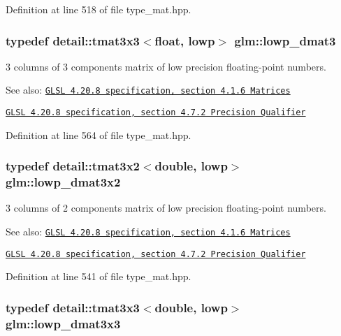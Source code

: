 Definition at line 518 of file type\_\-mat.hpp.\hypertarget{group__core__precision_g07d9423bdde2d7ff880d6ece01dc9e32}{
\subsubsection[lowp\_\-dmat3]{\setlength{\rightskip}{0pt plus 5cm}typedef detail::tmat3x3$<$float, lowp$>$ {\bf glm::lowp\_\-dmat3}}}
\label{group__core__precision_g07d9423bdde2d7ff880d6ece01dc9e32}


3 columns of 3 components matrix of low precision floating-point numbers.

\begin{Desc}
\item[See also:]\href{http://www.opengl.org/registry/doc/GLSLangSpec.4.20.8.pdf}{\tt GLSL 4.20.8 specification, section 4.1.6 Matrices} 

\href{http://www.opengl.org/registry/doc/GLSLangSpec.4.20.8.pdf}{\tt GLSL 4.20.8 specification, section 4.7.2 Precision Qualifier} \end{Desc}


Definition at line 564 of file type\_\-mat.hpp.\hypertarget{group__core__precision_g678c21e4fadeda255cfb146d40844bdd}{
\subsubsection[lowp\_\-dmat3x2]{\setlength{\rightskip}{0pt plus 5cm}typedef detail::tmat3x2$<$double, lowp$>$ {\bf glm::lowp\_\-dmat3x2}}}
\label{group__core__precision_g678c21e4fadeda255cfb146d40844bdd}


3 columns of 2 components matrix of low precision floating-point numbers.

\begin{Desc}
\item[See also:]\href{http://www.opengl.org/registry/doc/GLSLangSpec.4.20.8.pdf}{\tt GLSL 4.20.8 specification, section 4.1.6 Matrices} 

\href{http://www.opengl.org/registry/doc/GLSLangSpec.4.20.8.pdf}{\tt GLSL 4.20.8 specification, section 4.7.2 Precision Qualifier} \end{Desc}


Definition at line 541 of file type\_\-mat.hpp.\hypertarget{group__core__precision_gea1bc4ede38e1b904f01ff5ce59210ea}{
\subsubsection[lowp\_\-dmat3x3]{\setlength{\rightskip}{0pt plus 5cm}typedef detail::tmat3x3$<$double, lowp$>$ {\bf glm::lowp\_\-dmat3x3}}}
\label{group__core__precision_gea1bc4ede38e1b904f01ff5ce59210ea}


